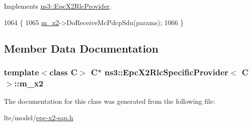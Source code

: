 Implements \hyperlink{classns3_1_1EpcX2RlcProvider_ae58a8184e3a1b3243f328b8d0efe3352}{ns3\+::\+Epc\+X2\+Rlc\+Provider}.


\begin{DoxyCode}
1064 \{
1065   \hyperlink{classns3_1_1EpcX2RlcSpecificProvider_a4d9cb42fc51537420e45949a040a4628}{m\_x2}->DoReceiveMcPdcpSdu(params);
1066 \}
\end{DoxyCode}


\subsection{Member Data Documentation}
\subsubsection[{\texorpdfstring{m\+\_\+x2}{m_x2}}]{\setlength{\rightskip}{0pt plus 5cm}template$<$class C$>$ {\bf C}$\ast$ {\bf ns3\+::\+Epc\+X2\+Rlc\+Specific\+Provider}$<$ {\bf C} $>$\+::m\+\_\+x2\hspace{0.3cm}{\ttfamily [private]}}\hypertarget{classns3_1_1EpcX2RlcSpecificProvider_a4d9cb42fc51537420e45949a040a4628}{}\label{classns3_1_1EpcX2RlcSpecificProvider_a4d9cb42fc51537420e45949a040a4628}


The documentation for this class was generated from the following file\+:\begin{DoxyCompactItemize}
\item 
lte/model/\hyperlink{epc-x2-sap_8h}{epc-\/x2-\/sap.\+h}\end{DoxyCompactItemize}
